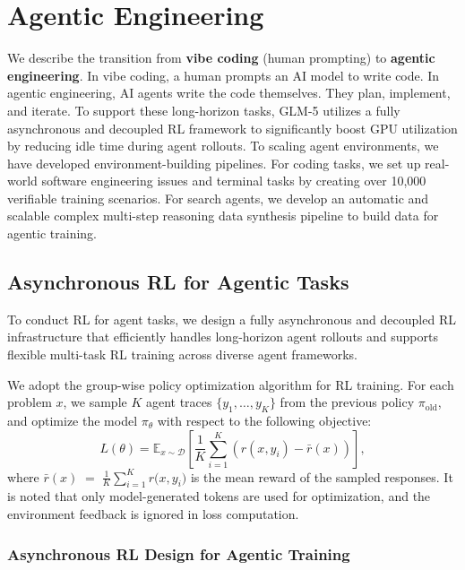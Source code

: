 \section{Agentic Engineering}
We describe the transition from \textbf{vibe coding} (human prompting) to \textbf{agentic engineering}.
In vibe coding, a human prompts an AI model to write code. In agentic engineering, AI agents write the code themselves. They plan, implement, and iterate. 
To support these long-horizon tasks, GLM-5 utilizes a fully asynchronous and decoupled RL framework to significantly boost GPU utilization by reducing idle time during agent rollouts. 
To scaling agent environments, we have developed environment-building pipelines. For coding tasks, we set up real-world  software engineering issues and terminal tasks by creating over 10,000 verifiable training scenarios. For search agents, we develop an automatic and scalable complex multi-step reasoning data synthesis pipeline to build data for agentic training.


\subsection{Asynchronous RL for Agentic Tasks}
To conduct RL for agent tasks, we design a fully asynchronous and decoupled RL infrastructure that efficiently handles long-horizon agent rollouts and supports flexible multi-task RL training across diverse agent frameworks.


We adopt the group-wise policy optimization algorithm for RL training.
For each problem \(x\), we sample \(K\) agent traces \(\{y_1,\dots,y_K\}\) from the previous policy
\(\pi_{\text{old}}\), and optimize the model \(\pi_\theta\) with respect to the following objective:
\[
L(\theta)
   = \mathbb{E}_{x\sim\mathcal{D}}\!\left[
        \frac{1}{K}\sum_{i=1}^{K}
        \left(
            r(x,y_i) - \bar{r}(x)
        \right)
     \right],
\]
where $\bar{r}(x) \;=\; \frac{1}{K}\sum_{i=1}^{K} r\bigl(x,y_i\bigr)$
is the mean reward of the sampled responses. It is noted that only model-generated tokens are used for optimization, and the environment feedback is ignored in loss computation. 

\subsubsection{Asynchronous RL Design for Agentic Training}


